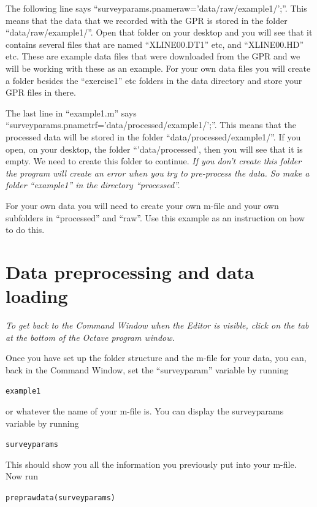 \documentclass[11pt]{article}
\begin{document}
The following line says
``surveyparams.pnameraw='data/raw/example1/';''. This means that the
data that we recorded with the GPR is stored in the folder
``data/raw/example1/''. Open that folder on your desktop and you will
see that it contains several files that are named ``XLINE00.DT1'' etc,
and ``XLINE00.HD'' etc. These are example data files that were
downloaded from the GPR and we will be working with these as an
example. For your own data files you will create a folder besides the
``exercise1'' etc folders in the data directory and store your GPR
files in there.

The last line in ``example1.m'' says
``surveyparams.pnametrf='data/processed/example1/';''. This means that
the processed data will be stored in the folder
``data/processed/example1/''. If you open, on your desktop, the folder
``'data/processed', then you will see that it is empty. We need to
create this folder to continue. \emph{If you don't create this folder
  the program will create an error when you try to pre-process the
  data. So make a folder ``example1'' in the directory ``processed''.}

For your own data you will need to create your own m-file and your own
subfolders in ``processed'' and ``raw''. Use this example as an
instruction on how to do this.

\section{Data preprocessing and data loading}
\emph{To get back to the Command Window when the Editor is visible,
  click on the tab at the bottom of the Octave program window.}

Once you have set up the folder structure and the m-file for your
data, you can, back in the Command Window, set the ``surveyparam''
variable by running

\qquad \verb#example1#

or whatever the name of your m-file is. You can display the
surveyparams variable by running

\qquad \verb#surveyparams#

This should show you all the information you previously put into your
m-file.  Now run

\qquad \verb#preprawdata(surveyparams)#
\end{document}
